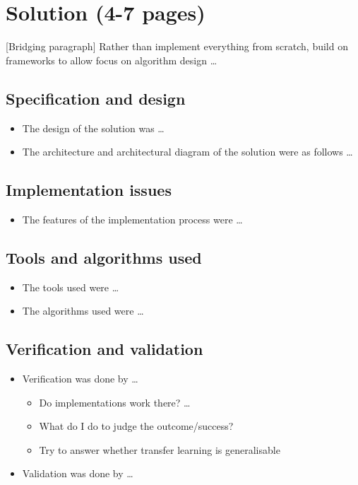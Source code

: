 \documentclass[12pt,a4paper]{article}
\begin{document}
\section{Solution (4-7 pages)}
[Bridging paragraph] Rather than implement everything from scratch, build on frameworks to allow focus on algorithm design \dots
\subsection{Specification and design}
\begin{itemize}
    \item The design of the solution was \dots
    \item The architecture and architectural diagram of the solution were as follows \dots
\end{itemize}

\subsection{Implementation issues}
\begin{itemize}
    \item The features of the implementation process were \dots
\end{itemize}

\subsection{Tools and algorithms used}
\begin{itemize}
    \item The tools used were \dots
    \item The algorithms used were \dots
\end{itemize}

\subsection{Verification and validation}
\begin{itemize}
    \item Verification was done by \dots 
    \begin{itemize}
        \item Do implementations work there? \dots 
        \item What do I do to judge the outcome/success?
        \item Try to answer whether transfer learning is generalisable 
    \end{itemize}
    \item Validation was done by \dots
\end{itemize}
\end{document}
